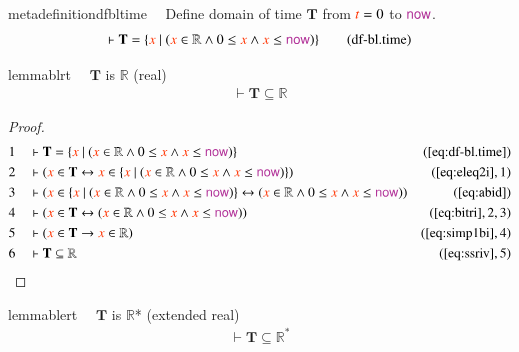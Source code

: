 \begin{restatable}{metadefinition}{dfbltime}~~ Define domain of time $\mathbf{T}$
from $\msc{t} = 0$ to $\mathsf{\mc{now}}$.
\begin{align}
\vdash \mathbf{T} = \{ \msc{x}~\vert~( \msc{x} \in \mathbb{R} \wedge 0 \le \msc{x}
    \wedge \msc{x} \le \mathsf{\mc{now}} )
    \}\label{eq:df-bl.time}\tag{df-bl.time}
\end{align}
\end{restatable}

\begin{restatable}{lemma}{blrt}~~ $\mathbf{T}$ is $\mathbb{R}$ (real)
\begin{align}
\vdash \mathbf{T} \subseteq \mathbb{R}\label{eq:bl.rt}\tag{bl.rt}
\end{align}
\end{restatable}

\begin{proof}
\begin{align}
  1 &&  & \vdash \mathbf{T} = \{ \msc{x}~\vert~( \msc{x} \in \mathbb{R} \wedge 0
      \le \msc{x} \wedge \msc{x} \le \mathsf{\mc{now}} )
      \}&(\mbox{\ref{eq:df-bl.time}})\notag
  \\ 2 &&  & \vdash ( \msc{x} \in \mathbf{T} \leftrightarrow \msc{x} \in \{
      \msc{x}~\vert~( \msc{x} \in \mathbb{R} \wedge 0 \le
      \msc{x} \wedge \msc{x} \le \mathsf{\mc{now}} ) \}
      )&(\mbox{\ref{eq:eleq2i}},1)\notag
  \\ 3 &&  & \vdash ( \msc{x} \in \{ \msc{x}~\vert~( \msc{x} \in \mathbb{R} \wedge
      0 \le \msc{x} \wedge \msc{x} \le \mathsf{\mc{now}} )
      \} \leftrightarrow ( \msc{x} \in \mathbb{R} \wedge 0
      \le \msc{x} \wedge \msc{x} \le \mathsf{\mc{now}} )
      )&(\mbox{\ref{eq:abid}})\notag
  \\ 4 &&  & \vdash ( \msc{x} \in \mathbf{T} \leftrightarrow ( \msc{x} \in
      \mathbb{R} \wedge 0 \le \msc{x} \wedge \msc{x} \le
      \mathsf{\mc{now}} )
      )&(\mbox{\ref{eq:bitri}},2,3)\notag
  \\ 5 &&  & \vdash ( \msc{x} \in \mathbf{T} \rightarrow \msc{x} \in \mathbb{R}
      )&(\mbox{\ref{eq:simp1bi}},4)\notag
  \\ 6 &&  & \vdash \mathbf{T} \subseteq
      \mathbb{R}&(\mbox{\ref{eq:ssriv}},5)\notag
\end{align}
\end{proof}

\begin{restatable}{lemma}{blert}~~ $\mathbf{T}$ is $\mathbb{R}$* (extended
real)
\begin{align}
\vdash \mathbf{T} \subseteq \mathbb{R}^{\ast}\label{eq:bl.ert}\tag{bl.ert}
\end{align}
\end{restatable}

